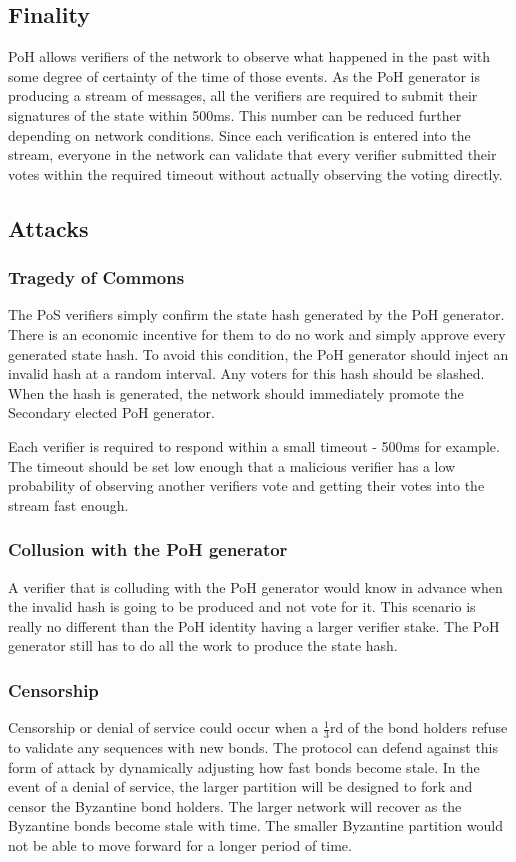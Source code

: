 \documentclass[12pt]{article}
\begin{document}
\subsection{Finality}\label{availability}
PoH allows verifiers of the network to observe what happened in the past with some degree of certainty of the time of those events. As the PoH generator is producing a stream of messages, all the verifiers are required to submit their signatures of the state within 500ms. This number can be reduced further depending on network conditions. Since each verification is entered into the stream, everyone in the network can validate that every verifier submitted their votes within the required timeout without actually observing the voting directly.

\subsection{Attacks}
\subsubsection{Tragedy of Commons}
The PoS verifiers simply confirm the state hash generated by the PoH generator. There is an economic incentive for them to do no work and simply approve every generated state hash. To avoid this condition, the PoH generator should inject an invalid hash at a random interval. Any voters for this hash should be slashed. When the hash is generated, the network should immediately promote the Secondary elected PoH generator.

Each verifier is required to respond within a small timeout - 500ms for example. The timeout should be set low enough that a malicious verifier has a low probability of observing another verifiers vote and getting their votes into the stream fast enough.

\subsubsection{Collusion with the PoH generator}\label{subsubsec:collusion}
A verifier that is colluding with the PoH generator would know in advance when the invalid hash is going to be produced and not vote for it. This scenario is really no different than the PoH identity having a larger verifier stake. The PoH generator still has to do all the work to produce the state hash.

\subsubsection{Censorship}\label{censorship}
Censorship or denial of service could occur when a \(\frac{1}{3}\)rd of the bond holders refuse to validate any sequences with new bonds. The protocol can defend against this form of attack by dynamically adjusting how fast bonds become stale. In the event of a denial of service, the larger partition will be designed to fork and censor the Byzantine bond holders. The larger network will recover as the Byzantine bonds become stale with time. The smaller Byzantine partition would not be able to move forward for a longer period of time.
\end{document}

